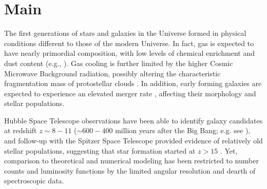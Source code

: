 \documentclass[sn-mathphys]{sn-jnl}%
\theoremstyle{thmstyleone}%
\theoremstyle{thmstyletwo}%
\theoremstyle{thmstylethree}%
\begin{document}
\section{Main} \label{sec:main}

The first generations of stars and galaxies in the Universe formed in physical conditions different to those of the modern Universe. In fact, gas is expected to have nearly primordial composition, with low levels of chemical enrichment and dust content (e.g., \cite{Torrey2019}). Gas cooling is further limited by the higher Cosmic Microwave Background radiation, possibly altering the characteristic fragmentation mass of protostellar clouds \citep{Smith2009}. In addition, early forming galaxies are expected to experience an elevated merger rate \citep{Fakhouri2008}, affecting their morphology and stellar populations.  

Hubble Space Telescope observations have been able to identify galaxy candidates at redshift $z\sim8-11$ ($\sim 600-400$ million years after the Big Bang; e.g. see \cite{Bouwens21}), and follow-up with the Spitzer Space Telescope provided evidence of relatively old stellar populations, suggesting that star formation started at $z>15$ \citep{Hashimoto2018,Roberts-Borsani20}. Yet, comparison to theoretical and numerical modeling has been restricted to number counts and luminosity functions by the limited angular resolution and dearth of spectroscopic data.  
\end{document}
